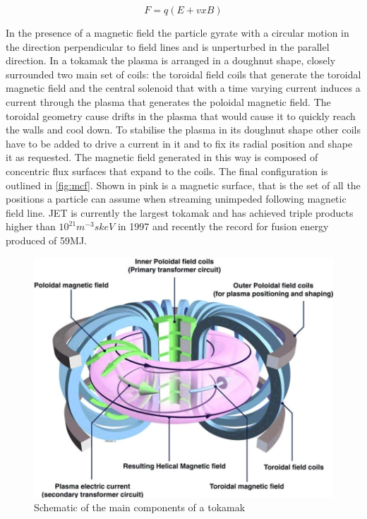 \begin{equation}
F = q ( E+ vxB )
\label{eq:lorentz}
\end{equation}

In the presence of a magnetic field the particle gyrate with a circular motion in the direction perpendicular to field lines and is unperturbed in the parallel direction. In a tokamak the plasma is arranged in a doughnut shape, closely surrounded two main set of coils: the toroidal field coils that generate the toroidal magnetic field and the central solenoid that with a time varying current induces a current through the plasma that generates the poloidal magnetic field. The toroidal geometry cause drifts in the plasma that would cause it to quickly reach the walls and cool down. To stabilise the plasma in its doughnut shape other coils have to be added to drive a current in it and to fix its radial position and shape it as requested.\cite{Chen1974} The magnetic field generated in this way is composed of concentric flux surfaces that expand to the coils. The final configuration is outlined in \autoref{fig:mcf}. Shown in pink is a magnetic surface, that is the set of all the positions a particle can assume when streaming unimpeded following magnetic field line. JET is currently the largest tokamak and has achieved triple products higher than $10^{21} m^{-3}skeV$ in 1997 \cite{Gormezano1998} and recently the record for fusion energy produced of 59MJ. \cite{Gibney2022}

\begin{figure}
	\centering
	\includegraphics[width=\linewidth]{Chapters/chapter1/figs/mcf.png}
	\caption{Schematic of the main components of a tokamak \cite{CulhamCentreforFusionEnergy2018}}
	\label{fig:mcf}
\end{figure}


